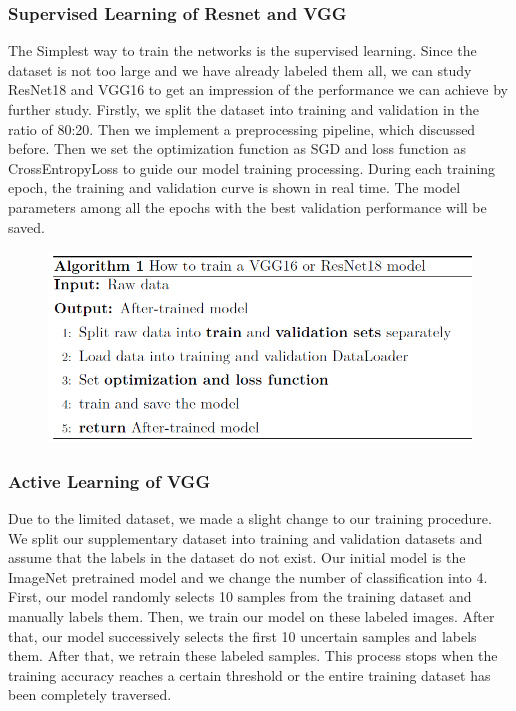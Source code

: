 \documentclass[lang=english,inputenc=utf8,fontsize=10pt]{ldvarticle}
\begin{document}
\subsubsection{Supervised Learning of Resnet and VGG}
The Simplest way to train the networks is the supervised learning. Since the dataset is not too large and we have already labeled them all, we can study ResNet18 and VGG16 to get an impression of the performance we can achieve by further study. Firstly, we split the dataset into training and validation in the ratio of 80:20. Then we implement a preprocessing pipeline, which discussed before. Then we set the optimization function as SGD and loss function as CrossEntropyLoss to guide our model training processing. During each training epoch, the training and validation curve is shown in real time. The model parameters among all the epochs with the best validation performance will be saved.\\

\begin{figure}[h!]
    \centering
    \includegraphics[scale=0.5]{train_VGG_ResNet18.png}
\end{figure}

\subsubsection{Active Learning of VGG}
Due to the limited dataset, we made a slight change to our training procedure. We split our supplementary dataset into training and validation datasets and assume that the labels in the dataset do not exist. Our initial model is the ImageNet pretrained model and we change the number of classification into 4.\\
First, our model randomly selects 10 samples from the training dataset and manually labels them. Then, we train our model on these labeled images. After that, our model successively selects the first 10 uncertain samples and labels them. After that, we retrain these labeled samples. This process stops when the training accuracy reaches a certain threshold or the entire training dataset has been completely traversed.\\
\end{document}
